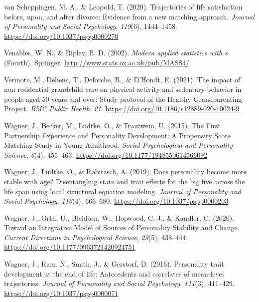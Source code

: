 \documentclass[
  english,
  man,floatsintext]{apa7}
\begin{document}
\leavevmode\hypertarget{ref-vanscheppingenTrajectoriesLifeSatisfaction2020}{}%
van Scheppingen, M. A., \& Leopold, T. (2020). Trajectories of life satisfaction before, upon, and after divorce: Evidence from a new matching approach. \emph{Journal of Personality and Social Psychology}, \emph{119}(6), 1444--1458. \url{https://doi.org/10.1037/pspp0000270}

\leavevmode\hypertarget{ref-R-MASS}{}%
Venables, W. N., \& Ripley, B. D. (2002). \emph{Modern applied statistics with s} (Fourth). Springer. \url{http://www.stats.ox.ac.uk/pub/MASS4/}

\leavevmode\hypertarget{ref-vermoteImpactNonresidentialGrandchild2021a}{}%
Vermote, M., Deliens, T., Deforche, B., \& D'Hondt, E. (2021). The impact of non-residential grandchild care on physical activity and sedentary behavior in people aged 50 years and over: Study protocol of the Healthy Grandparenting Project. \emph{BMC Public Health}, \emph{21}. \url{https://doi.org/10.1186/s12889-020-10024-9}

\leavevmode\hypertarget{ref-wagnerFirstPartnershipExperience2015}{}%
Wagner, J., Becker, M., Lüdtke, O., \& Trautwein, U. (2015). The First Partnership Experience and Personality Development: A Propensity Score Matching Study in Young Adulthood. \emph{Social Psychological and Personality Science}, \emph{6}(4), 455--463. \url{https://doi.org/10.1177/1948550614566092}

\leavevmode\hypertarget{ref-wagnerDoesPersonalityBecome2019}{}%
Wagner, J., Lüdtke, O., \& Robitzsch, A. (2019). Does personality become more stable with age? Disentangling state and trait effects for the big five across the life span using local structural equation modeling. \emph{Journal of Personality and Social Psychology}, \emph{116}(4), 666--680. \url{https://doi.org/10.1037/pspp0000203}

\leavevmode\hypertarget{ref-wagnerIntegrativeModelSources2020}{}%
Wagner, J., Orth, U., Bleidorn, W., Hopwood, C. J., \& Kandler, C. (2020). Toward an Integrative Model of Sources of Personality Stability and Change. \emph{Current Directions in Psychological Science}, \emph{29}(5), 438--444. \url{https://doi.org/10.1177/0963721420924751}

\leavevmode\hypertarget{ref-wagnerPersonalityTraitDevelopment2016}{}%
Wagner, J., Ram, N., Smith, J., \& Gerstorf, D. (2016). Personality trait development at the end of life: Antecedents and correlates of mean-level trajectories. \emph{Journal of Personality and Social Psychology}, \emph{111}(3), 411--429. \url{https://doi.org/10.1037/pspp0000071}
\end{document}

